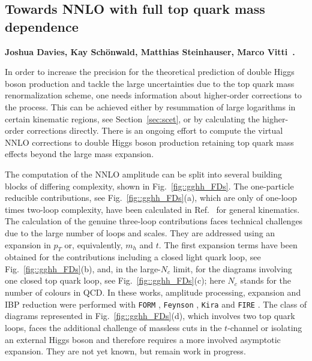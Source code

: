 \subsection{Towards NNLO with full top quark mass dependence}


\textbf{Joshua Davies, Kay Schönwald, Matthias Steinhauser, Marco Vitti~\cite{Davies:2023obx,Davies:2024znp,Davies:2025ghl}.}

\noindent In order to increase the precision for the theoretical prediction of double Higgs boson production and tackle the large uncertainties due to the top quark mass renormalization scheme, one needs information about higher-order corrections to the process.
This can be achieved either by resummation of large logarithms in certain kinematic regions, see Section~\ref{sec:scet}, or by calculating the higher-order corrections directly.
There is an ongoing effort to compute the virtual NNLO corrections to double Higgs boson production retaining top quark mass effects beyond the large mass expansion.


The computation of the NNLO amplitude can be split into several building blocks of differing complexity, shown in Fig.~\ref{fig::gghh_FDs}.
The one-particle reducible contributions, see Fig.~\ref{fig::gghh_FDs}(a), which are only of one-loop times two-loop complexity, have been calculated in Ref.~\cite{Davies:2024znp} for general kinematics.
The calculation of the genuine three-loop contributions faces technical challenges due to the large number of loops and scales.
They are addressed using an expansion in $p_T$ or, equivalently, $m_h$ and $t$.
The first expansion terms have been obtained for the contributions including a closed light quark loop, see Fig.~\ref{fig::gghh_FDs}(b), and, in the large-$N_c$ limit, for the diagrams involving one closed top quark loop, see Fig.~\ref{fig::gghh_FDs}(c); here $N_c$ stands for the number of colours in QCD.
In these works, amplitude processing, expansion and IBP reduction were performed with {\tt FORM} \cite{Ruijl:2017dtg,Davies:2026cci}, {\tt Feynson} \cite{Maheria:2022dsq}, {\tt Kira} \cite{Lange:2025ofh} and {\tt FIRE} \cite{Smirnov:2025prc}.
The class of diagrams represented in Fig.~\ref{fig::gghh_FDs}(d), which involves two top quark loops, faces the additional challenge of massless cuts in the $t$-channel or isolating an external Higgs boson and therefore requires a more involved asymptotic expansion.
They are not yet known, but remain work in progress.

